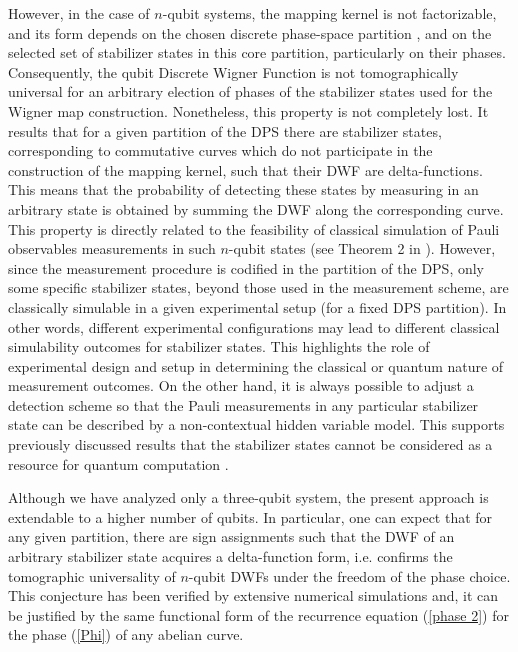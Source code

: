 \documentclass[quantumrep,article,submit,pdftex,moreauthors]{Definitions/mdpi}
\begin{document}
However, in the case of $n$-qubit systems, the mapping kernel is not
factorizable, and its form depends on the chosen discrete phase-space
partition \cite{Bjork2007}, and on the selected set of stabilizer states in
this core partition, particularly on their phases. Consequently, the qubit
Discrete Wigner Function is not tomographically universal for an arbitrary
election of phases of the stabilizer states used for the Wigner map
construction. Nonetheless, this property is not completely lost. It results
that for a given partition of the DPS there are stabilizer states,
corresponding to commutative curves which do not participate in the
construction of the mapping kernel, such that their DWF are delta-functions.
This means that the probability of detecting these states by measuring in an
arbitrary state is obtained by summing the DWF along the corresponding curve.
This property is directly related to the feasibility of classical simulation of
Pauli observables measurements in such $n$-qubit states (see Theorem 2 in
\cite{Raus17}). However, since the measurement procedure is codified in the
partition of the DPS, only some specific stabilizer states, beyond those used
in the measurement scheme, are classically simulable in a given experimental
setup (for a fixed DPS partition). In other words, different experimental
configurations may lead to different classical simulability outcomes for
stabilizer states. This highlights the role of experimental design and setup in
determining the classical or quantum nature of measurement outcomes. On the
other hand, it is always possible to adjust a detection scheme so that the
Pauli measurements in any particular stabilizer state can be described by a
non-contextual hidden variable model. This supports previously discussed
results \cite{Raus17,contextMagic} that the stabilizer states cannot be
considered as a resource for quantum computation \cite{gottKnill}.

Although we have analyzed only a three-qubit system, the present approach is
extendable to a higher number of qubits. In particular, one can expect that
for any given partition, there are sign assignments such that the DWF of an
arbitrary stabilizer state acquires a delta-function form, i.e. confirms the
tomographic universality of $n$-qubit DWFs under the freedom of the phase
choice. This conjecture has been verified by extensive numerical simulations
and, it can be justified by the same functional form of the recurrence
equation (\ref{phase 2}) for the phase (\ref{Phi}) of any abelian curve.
\end{document}
